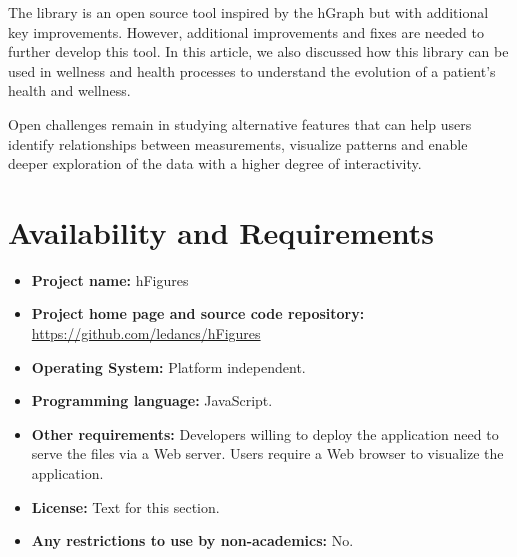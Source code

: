 \documentclass[twocolumn]{bmcart}%
\begin{document}
The library is an open source tool inspired by the hGraph but with additional key improvements. However, additional improvements and fixes are needed to further develop this tool. In this article, we also discussed how this library can be used in wellness and health processes to understand the evolution of a patient's health and wellness.

Open challenges remain in studying alternative features that can help users identify relationships between measurements, visualize patterns and enable deeper exploration of the data with a higher degree of interactivity.


\section*{Availability and Requirements}

\begin{itemize}
\item \textbf{Project name:} hFigures
\item \textbf{Project home page and source code repository:} \url{https://github.com/ledancs/hFigures}
\item \textbf{Operating System:} Platform independent.
\item \textbf{Programming language:} JavaScript.
\item \textbf{Other requirements:} Developers willing to deploy the application need to serve the files via a Web server. Users require a Web browser to visualize the application.
\item \textbf{License:} Text for this section.
\item \textbf{Any restrictions to use by non-academics:} No.
\end{itemize}

\end{document}

